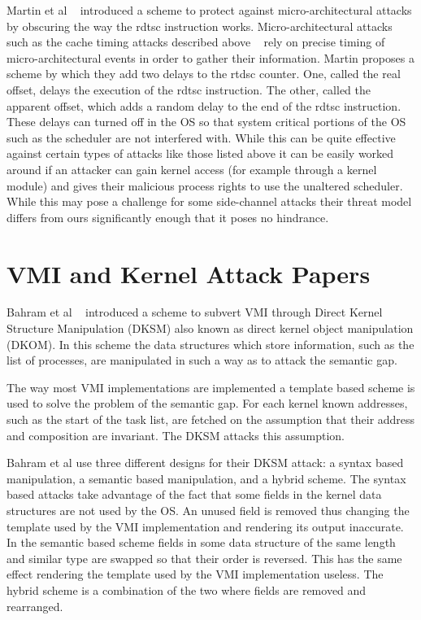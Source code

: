 Martin et al ~\cite{martin2012timewarp} introduced a scheme to protect against micro-architectural attacks by obscuring the way the rdtsc instruction works. Micro-architectural attacks such as the cache timing attacks described above ~\cite{zhang_cross-vm_2012,ristenpart_hey_2009,zhang_homealone:_2011} rely on precise timing of micro-architectural events in order to gather their information. Martin proposes a scheme by which they add two delays to the rtdsc counter. One, called the real offset, delays the execution of the rdtsc instruction. The other, called the apparent offset, which adds a random delay to the end of the rdtsc instruction. These delays can turned off in the OS so that system critical portions of the OS such as the scheduler are not interfered with.  While this can be quite effective against certain types of attacks like those listed above it can be easily worked around if an attacker can gain kernel access (for example through a kernel module) and gives their malicious process rights to use the unaltered scheduler. While this may pose a challenge for some side-channel attacks their threat model differs from ours significantly enough that it poses no hindrance.

\section{VMI and Kernel Attack Papers}

Bahram et al ~\cite{bahram_dksm:_2010} introduced a scheme to subvert VMI through Direct Kernel Structure Manipulation (DKSM) also known as direct kernel object manipulation (DKOM). In this scheme the data structures which store information, such as the list of processes, are manipulated in such a way as to attack the semantic gap. 

The way most VMI implementations are implemented a template based scheme is used to solve the problem of the semantic gap. For each kernel known addresses, such as the start of the task list, are fetched on the assumption that their address and composition are invariant. The DKSM attacks this assumption. 

Bahram et al use three different designs for their DKSM attack: a syntax based manipulation, a semantic based manipulation, and a hybrid scheme. The syntax based attacks take advantage of the fact that some fields in the kernel data structures are not used by the OS. An unused field is removed thus changing the template used by the VMI implementation and rendering its output inaccurate.  In the semantic based scheme fields in some data structure of the same length and similar type are swapped so that their order is reversed. This has the same effect rendering the template used by the VMI implementation useless. The hybrid scheme is a combination of the two where fields are removed and rearranged. 

